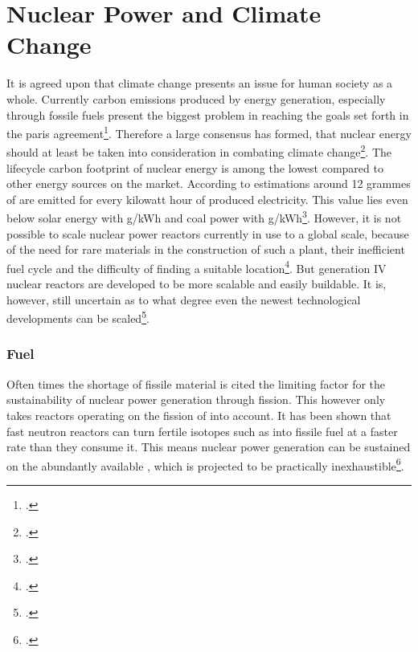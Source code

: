 \chapter{Nuclear Power and Climate Change}
It is agreed upon that climate change presents an issue for human society as a whole. Currently
carbon emissions produced by energy generation, especially through fossile fuels
present the biggest problem in reaching the goals set forth in the paris agreement\footcite{paris}.
Therefore a large consensus has formed, that nuclear energy should at least be taken into consideration
in combating climate change\footcite{nucandclim}.
The lifecycle carbon footprint of nuclear energy is among the lowest compared to other energy
sources on the market. According to estimations around 12 grammes of  are emitted for
every kilowatt hour of produced electricity. This value lies even below solar energy with \unit[40]{g/kWh}
and coal power with \unit[820]{g/kWh}\footcite{ipcc}. However, it is not possible to scale
nuclear power reactors currently in use to a global scale, because of the need for rare materials
in the construction of such a plant, their inefficient fuel cycle and the difficulty of finding a
suitable location\footcite{scale}. But generation IV nuclear reactors are developed to be more
scalable and easily buildable. It is, however, still uncertain as to what degree even the newest
technological developments can be scaled\footcite{GIFAR}.
\subsection{Fuel}
Often times the shortage of fissile material is cited the limiting factor for the sustainability of
nuclear power generation through fission. This however only takes reactors operating on the fission
of  into account. It has been shown that fast neutron reactors can turn fertile isotopes
such as  into fissile fuel at a faster rate than they consume it. This means nuclear
power generation can be sustained on the abundantly available , which is projected to
be practically inexhaustible\footcite{inex}.